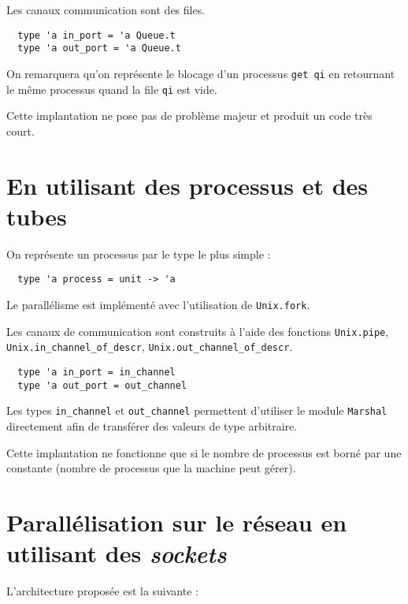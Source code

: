 \documentclass[11pt]{article}
\begin{document}
\smallskip

Les canaux communication sont des files.

\begin{lstlisting}
  type 'a in_port = 'a Queue.t
  type 'a out_port = 'a Queue.t
\end{lstlisting}

On remarquera qu'on repr\'esente le blocage d'un processus {\tt get qi}
en retournant le m\^eme processus quand la file {\tt qi} est vide.

\smallskip

Cette implantation ne pose pas de probl\`eme majeur
et produit un code tr\`es court.

\section{En utilisant des processus et des tubes}

On repr\'esente un processus par le type le plus simple :

\begin{lstlisting}
  type 'a process = unit -> 'a
\end{lstlisting}

Le parall\'elisme est impl\'ement\'e avec l'utilisation de {\tt Unix.fork}.

\smallskip

Les canaux de communication sont construits \`a l'aide des fonctions
{\tt Unix.pipe},
{\tt Unix.in\_channel\_of\_descr}, {\tt Unix.out\_channel\_of\_descr}.

\begin{lstlisting}
  type 'a in_port = in_channel
  type 'a out_port = out_channel
\end{lstlisting}

Les types {\tt in\_channel} et {\tt out\_channel} permettent d'utiliser
le module {\tt Marshal} directement afin de transf\'erer des valeurs
de type arbitraire.

\smallskip

Cette implantation ne fonctionne que si le nombre de processus est
born\'e par une constante (nombre de processus que la machine peut g\'erer).

\section{Parall\'elisation sur le r\'eseau en utilisant des {\sl sockets}}

L'architecture propos\'ee est la suivante :
\end{document}

